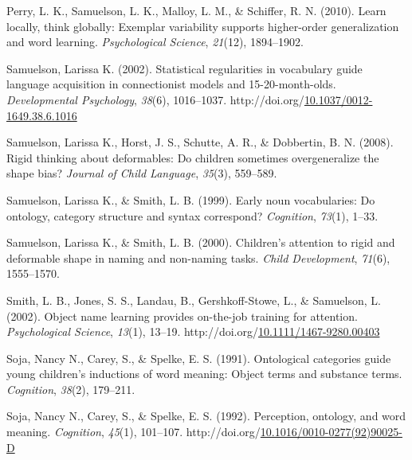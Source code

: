 \documentclass[10pt, letterpaper]{article}
\newenvironment{CSLReferences}%
  {}%
  {\par}
\begin{document}
\begin{CSLReferences}{1}{0}
\leavevmode{}%
Perry, L. K., Samuelson, L. K., Malloy, L. M., \& Schiffer, R. N.
(2010). Learn locally, think globally: Exemplar variability supports
higher-order generalization and word learning. \emph{Psychological
Science}, \emph{21}(12), 1894--1902.

\leavevmode{}%
Samuelson, Larissa K. (2002). Statistical regularities in vocabulary
guide language acquisition in connectionist models and 15-20-month-olds.
\emph{Developmental Psychology}, \emph{38}(6), 1016--1037.
http://doi.org/\href{https://doi.org/10.1037/0012-1649.38.6.1016}{10.1037/0012-1649.38.6.1016}

\leavevmode{}%
Samuelson, Larissa K., Horst, J. S., Schutte, A. R., \& Dobbertin, B. N.
(2008). Rigid thinking about deformables: Do children sometimes
overgeneralize the shape bias? \emph{Journal of Child Language},
\emph{35}(3), 559--589.

\leavevmode{}%
Samuelson, Larissa K., \& Smith, L. B. (1999). Early noun vocabularies:
Do ontology, category structure and syntax correspond? \emph{Cognition},
\emph{73}(1), 1--33.

\leavevmode{}%
Samuelson, Larissa K., \& Smith, L. B. (2000). Children's attention to
rigid and deformable shape in naming and non-naming tasks. \emph{Child
Development}, \emph{71}(6), 1555--1570.

\leavevmode{}%
Smith, L. B., Jones, S. S., Landau, B., Gershkoff-Stowe, L., \&
Samuelson, L. (2002). Object name learning provides on-the-job training
for attention. \emph{Psychological Science}, \emph{13}(1), 13--19.
http://doi.org/\href{https://doi.org/10.1111/1467-9280.00403}{10.1111/1467-9280.00403}

\leavevmode{}%
Soja, Nancy N., Carey, S., \& Spelke, E. S. (1991). Ontological
categories guide young children's inductions of word meaning: Object
terms and substance terms. \emph{Cognition}, \emph{38}(2), 179--211.

\leavevmode{}%
Soja, Nancy N., Carey, S., \& Spelke, E. S. (1992). Perception,
ontology, and word meaning. \emph{Cognition}, \emph{45}(1), 101--107.
http://doi.org/\href{https://doi.org/10.1016/0010-0277(92)90025-D}{10.1016/0010-0277(92)90025-D}


\end{CSLReferences}
\end{document}
